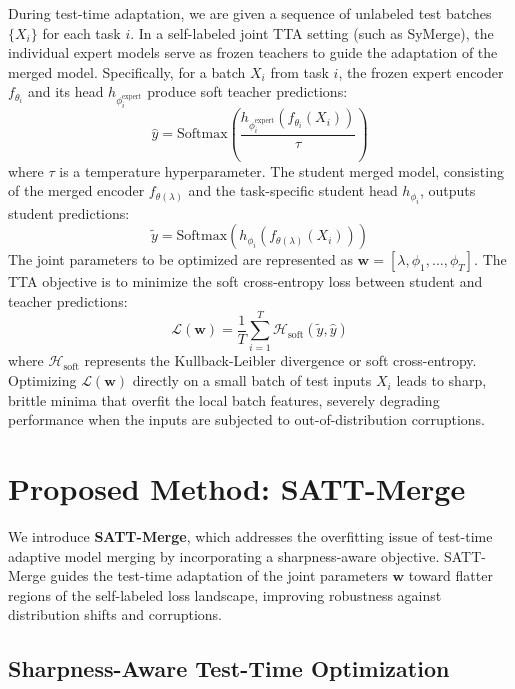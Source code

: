 \documentclass{article}
\begin{document}
During test-time adaptation, we are given a sequence of unlabeled test batches $\{X_i\}$ for each task $i$. In a self-labeled joint TTA setting (such as SyMerge), the individual expert models serve as frozen teachers to guide the adaptation of the merged model. Specifically, for a batch $X_i$ from task $i$, the frozen expert encoder $f_{\theta_i}$ and its head $h_{\phi_i^{\text{expert}}}$ produce soft teacher predictions:
\begin{equation}
    \hat{y} = \text{Softmax}\left( \frac{h_{\phi_i^{\text{expert}}}(f_{\theta_i}(X_i))}{\tau} \right)
\end{equation}
where $\tau$ is a temperature hyperparameter. The student merged model, consisting of the merged encoder $f_{\theta(\lambda)}$ and the task-specific student head $h_{\phi_i}$, outputs student predictions:
\begin{equation}
    \tilde{y} = \text{Softmax}\left( h_{\phi_i}(f_{\theta(\lambda)}(X_i)) \right)
\end{equation}
The joint parameters to be optimized are represented as $\mathbf{w} = [\lambda, \phi_1, \dots, \phi_T]$. The TTA objective is to minimize the soft cross-entropy loss between student and teacher predictions:
\begin{equation}
    \mathcal{L}(\mathbf{w}) = \frac{1}{T}\sum_{i=1}^T \mathcal{H}_{\text{soft}}(\tilde{y}, \hat{y})
\end{equation}
where $\mathcal{H}_{\text{soft}}$ represents the Kullback-Leibler divergence or soft cross-entropy. Optimizing $\mathcal{L}(\mathbf{w})$ directly on a small batch of test inputs $X_i$ leads to sharp, brittle minima that overfit the local batch features, severely degrading performance when the inputs are subjected to out-of-distribution corruptions.

\section{Proposed Method: SATT-Merge}
\label{sec:method}

We introduce \textbf{SATT-Merge}, which addresses the overfitting issue of test-time adaptive model merging by incorporating a sharpness-aware objective. SATT-Merge guides the test-time adaptation of the joint parameters $\mathbf{w}$ toward flatter regions of the self-labeled loss landscape, improving robustness against distribution shifts and corruptions.

\subsection{Sharpness-Aware Test-Time Optimization}
\end{document}
